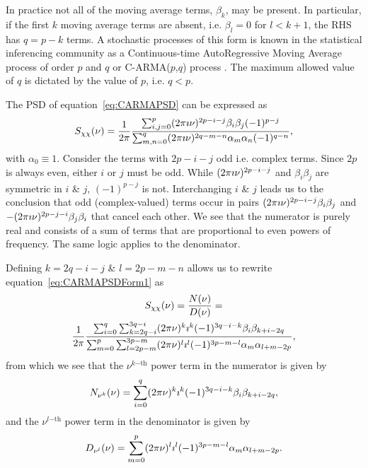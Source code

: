 \documentclass[a4paper,fleqn,usenatbib]{mnras}
\begin{document}
In practice not all of the moving average terms, $\beta_{k}$, may be present. In particular, if the first $k$ moving average terms are absent, i.e. $\beta_{l} = 0$ for $l < k+1$, the RHS has $q = p - k$ terms. A stochastic processes of this form is known in the statistical inferencing community as a Continuous-time AutoRegressive Moving Average process of order $p$ and $q$ or C-ARMA($p$,$q$) process \citep{DimensionEstimationBrockwell,HandbookOfStatistics19Brockwell,Brockwell14,Kelly14}. The maximum allowed value of $q$ is dictated by the value of $p$, i.e. $q < p$.

The PSD of equation~\eqref{eq:CARMAPSD} can be expressed as 
\begin{equation}\label{eq:CARMAPSDForm1}
S_{\chi\chi}(\nu) = \frac{1}{2 \pi }\frac{\sum_{i,j = 0}^{p} (2 \pi \imath \nu)^{2p - i -j} \beta_{i} \beta_{j} (-1)^{p - j}}{\sum_{m,n = 0}^{q} (2 \pi \imath \nu)^{2q - m -n} \alpha_{m} \alpha_{n} (-1)^{q - n}},
\end{equation}
with $\alpha_{0} \equiv 1$. Consider the terms with $2p - i - j$ odd i.e. complex terms. Since $2p$ is always even, either $i$ or $j$ must be odd. While $(2 \pi \imath \nu)^{2p - i -j}$ and $\beta_{i} \beta_{j}$ are symmetric in $i$ \& $j$, $(-1)^{p - j}$ is not. Interchanging $i$ \& $j$ leads us to the conclusion that odd (complex-valued) terms occur in pairs $(2 \pi \imath \nu)^{2p - i -j}\beta_{i} \beta_{j}$ and $-(2 \pi \imath \nu)^{2p - j -i}\beta_{j} \beta_{i}$ that cancel each other. We see that the numerator is purely real and consists of a sum of terms that are proportional to even powers of frequency. The same logic applies to the denominator.

Defining $k = 2q - i - j$ \& $l = 2p - m - n$ allows us to rewrite equation~\eqref{eq:CARMAPSDForm1} as
\begin{multline}\label{eq:CARMAPSDForm1}
S_{\chi\chi}(\nu) = \frac{N(\nu)}{D(\nu)} = \\ \frac{1}{2 \pi } \frac{\sum_{i = 0}^{q}\sum_{k = 2q - i}^{3q - i} (2\pi\nu)^{k} \imath^{k} (-1)^{3q - i - k} \beta_{i}\beta_{k + i - 2q}}{\sum_{m = 0}^{p}\sum_{l = 2p - m}^{3p - m} (2\pi\nu)^{l} \imath^{l} (-1)^{3p - m - l} \alpha_{m}\alpha_{l + m - 2p}},
\end{multline}
from which we see that the $\nu^{k\mathrm{-th}}$ power term in the numerator is given by
\begin{equation}\label{eq:PSDNumerator}
N_{\nu^{k}}(\nu) = \sum_{i = 0}^{q} (2\pi\nu)^{k} \imath^{k} (-1)^{3q - i - k} \beta_{i}\beta_{k + i - 2q},
\end{equation}
and the $\nu^{l\mathrm{-th}}$ power term in the denominator is given by
\begin{equation}\label{eq:PSDDenominator}
D_{\nu^{l}}(\nu) = \sum_{m = 0}^{p} (2\pi\nu)^{l} \imath^{l} (-1)^{3p - m - l} \alpha_{m}\alpha_{l + m - 2p}.
\end{equation}
\end{document}
